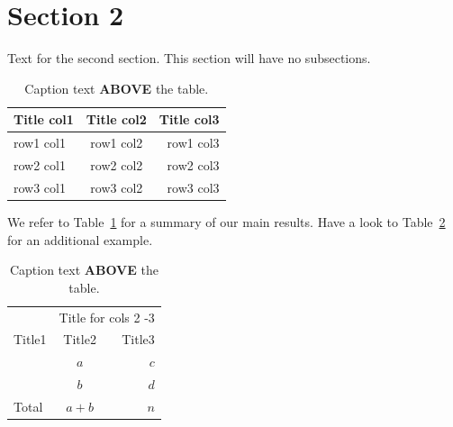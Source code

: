\documentclass[twoside]{report}
\begin{document}
\section{Section 2}
Text for the second section. This section will have no subsections.





\begin{table}[!ht]\centering
\caption{\label{smith:tab1} Caption text \textbf{ABOVE} the table.}
\medskip
\begin{tabular}{lcr}
\toprule[0.09 em]
Title col1 & Title col2 & Title col3 \\
\midrule
row1 col1  & row1 col2  & row1 col3  \\
row2 col1  & row2 col2  & row2 col3  \\ %
row3 col1  & row3 col2  & row3 col3  \\
\bottomrule[0.09 em]
\end{tabular}
\end{table}

We refer to Table~\ref{smith:tab1} for a summary of our main results. Have a look to Table~\ref{smith:tab2} for
an additional example.

\begin{table}[!ht]\centering
\caption{\label{smith:tab2} Caption text \textbf{ABOVE} the table.}
\medskip
\begin{tabular}{lcr}
\toprule[0.09 em]
  &\multicolumn{2}{c}{Title  for cols 2 -3} \\
\cmidrule{2-3} %
Title1 & Title2 & Title3 \\
\midrule
& $a$  & $c$ \\
& $b$  & $d$ \\ %
\midrule[0 em]
Total  & $a+b$  & $n$  \\
\bottomrule[0.09 em]
\end{tabular}
\end{table}
\end{document}
